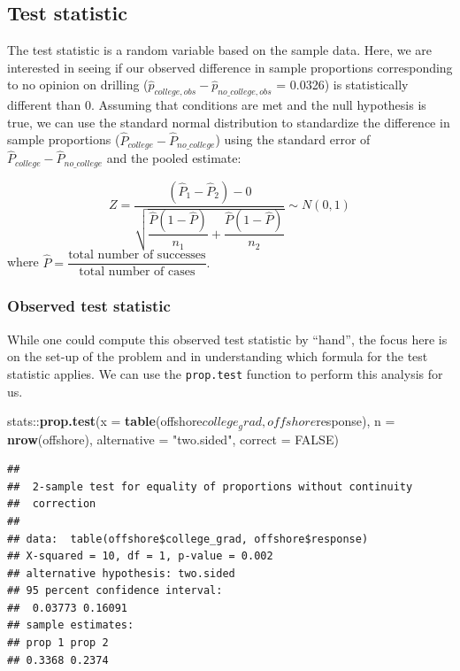 \documentclass[]{tufte-book}
\newenvironment{Shaded}{\begin{snugshade}}{\end{snugshade}}
\newcommand{\KeywordTok}[1]{\textcolor[rgb]{0.13,0.29,0.53}{\textbf{{#1}}}}
\newcommand{\DataTypeTok}[1]{\textcolor[rgb]{0.13,0.29,0.53}{{#1}}}
\newcommand{\StringTok}[1]{\textcolor[rgb]{0.31,0.60,0.02}{{#1}}}
\newcommand{\OtherTok}[1]{\textcolor[rgb]{0.56,0.35,0.01}{{#1}}}
\newcommand{\NormalTok}[1]{{#1}}
\theoremstyle{definition}
\theoremstyle{definition}
\theoremstyle{remark}
\begin{document}
\subsection{Test statistic}\label{test-statistic-2}

The test statistic is a random variable based on the sample data. Here,
we are interested in seeing if our observed difference in sample
proportions corresponding to no opinion on drilling
(\(\hat{p}_{college, obs} - \hat{p}_{no\_college, obs}\) = 0.0326) is
statistically different than 0. Assuming that conditions are met and the
null hypothesis is true, we can use the standard normal distribution to
standardize the difference in sample proportions
(\(\hat{P}_{college} - \hat{P}_{no\_college}\)) using the standard error
of \(\hat{P}_{college} - \hat{P}_{no\_college}\) and the pooled
estimate:

\[ Z =\dfrac{ (\hat{P}_1 - \hat{P}_2) - 0}{\sqrt{\dfrac{\hat{P}(1 - \hat{P})}{n_1} + \dfrac{\hat{P}(1 - \hat{P})}{n_2} }} \sim N(0, 1) \]
where
\(\hat{P} = \dfrac{\text{total number of successes} }{ \text{total number of cases}}.\)

\subsubsection{Observed test statistic}\label{observed-test-statistic-2}

While one could compute this observed test statistic by ``hand'', the
focus here is on the set-up of the problem and in understanding which
formula for the test statistic applies. We can use the
\texttt{prop.test} function to perform this analysis for us.

\begin{Shaded}
\begin{Highlighting}[]
\NormalTok{stats::}\KeywordTok{prop.test}\NormalTok{(}\DataTypeTok{x =} \KeywordTok{table}\NormalTok{(offshore$college_grad, offshore$response),}
       \DataTypeTok{n =} \KeywordTok{nrow}\NormalTok{(offshore),}
       \DataTypeTok{alternative =} \StringTok{"two.sided"}\NormalTok{,}
       \DataTypeTok{correct =} \OtherTok{FALSE}\NormalTok{)}
\end{Highlighting}
\end{Shaded}

\begin{verbatim}
## 
##  2-sample test for equality of proportions without continuity
##  correction
## 
## data:  table(offshore$college_grad, offshore$response)
## X-squared = 10, df = 1, p-value = 0.002
## alternative hypothesis: two.sided
## 95 percent confidence interval:
##  0.03773 0.16091
## sample estimates:
## prop 1 prop 2 
## 0.3368 0.2374
\end{verbatim}
\end{document}
